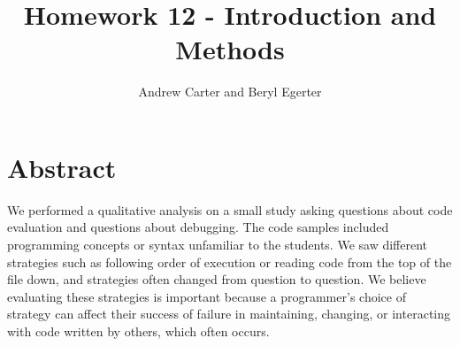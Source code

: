 \documentclass{article}
\title{Homework 12 - Introduction and Methods}
\author{Andrew Carter and Beryl Egerter}
\begin{document}
\maketitle
\section{Abstract}


We performed a qualitative analysis on a small study asking questions about code evaluation and questions about debugging. The code samples included programming concepts or syntax unfamiliar to the students. We saw different strategies such as following order of execution or reading code from the top of the file down, and strategies often changed from question to question. We believe evaluating these strategies is important because a programmer's choice of strategy can affect their success of failure in maintaining, changing, or interacting with code written by others, which often occurs. 


\end{document}

